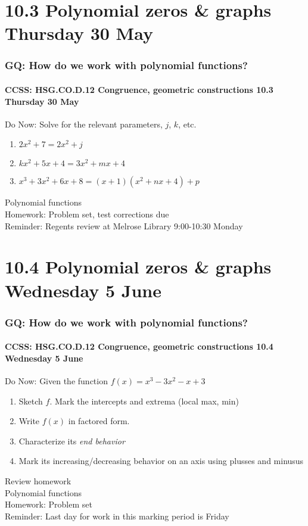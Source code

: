 \documentclass{beamer}
\begin{document}
  \section{10.3 Polynomial zeros \& graphs Thursday 30 May}
    \frame
    {
      \frametitle{GQ: How do we work with polynomial functions?}
      \framesubtitle{CCSS: HSG.CO.D.12 Congruence, geometric constructions \hfill \alert{10.3 Thursday 30 May}}

      \begin{block}{Do Now: Solve for the relevant parameters, $j$, $k$, etc.}
        \begin{enumerate}
          \item $2x^2+7=2x^2+j$
          \item $kx^2+5x+4=3x^2+mx+4$
          \item $x^3+3x^2+6x+8=(x+1)(x^2+nx+4)+p$
        \end{enumerate}
      \end{block}
      Polynomial functions\\[0.25cm]
      Homework: Problem set, test corrections due\\
      Reminder: Regents review at Melrose Library 9:00-10:30 Monday
    }

    \section{10.4 Polynomial zeros \& graphs Wednesday 5 June}
      \frame
      {
        \frametitle{GQ: How do we work with polynomial functions?}
        \framesubtitle{CCSS: HSG.CO.D.12 Congruence, geometric constructions \hfill \alert{10.4 Wednesday 5 June}}

        \begin{block}{Do Now: Given the function $f(x)=x^3-3x^2-x+3$}
          \begin{enumerate}
            \item Sketch $f$. Mark the intercepts and extrema (local max, min)
            \item Write $f(x)$ in factored form.
            \item Characterize its \emph{end behavior}
            \item Mark its increasing/decreasing behavior on an axis using plusses and minusus
          \end{enumerate}
        \end{block}
        Review homework\\
        Polynomial functions\\[0.25cm]
        Homework: Problem set\\
        Reminder: Last day for work in this marking period is \alert{Friday}
      }
\end{document}

